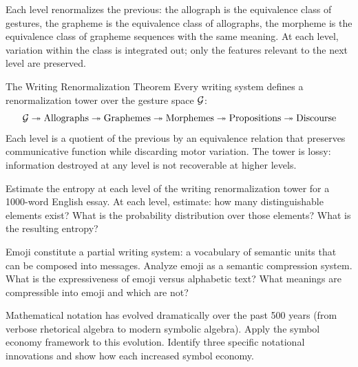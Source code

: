 Each level renormalizes the previous: the allograph is the equivalence
class of gestures, the grapheme is the equivalence class of allographs,
the morpheme is the equivalence class of grapheme sequences with the
same meaning. At each level, variation within the class is integrated
out; only the features relevant to the next level are preserved.

\begin{namedthm}{The Writing Renormalization Theorem}
  Every writing system defines a renormalization tower over the
  gesture space $\mathcal{G}$:
  \[
    \mathcal{G} \twoheadrightarrow \text{Allographs}
    \twoheadrightarrow \text{Graphemes}
    \twoheadrightarrow \text{Morphemes}
    \twoheadrightarrow \text{Propositions}
    \twoheadrightarrow \text{Discourse}
  \]
  Each level is a quotient of the previous by an equivalence relation
  that preserves communicative function while discarding motor variation.
  The tower is lossy: information destroyed at any level is not
  recoverable at higher levels.
\end{namedthm}

\begin{exercise}
  Estimate the entropy at each level of the writing renormalization
  tower for a 1000-word English essay. At each level, estimate: how
  many distinguishable elements exist? What is the probability
  distribution over those elements? What is the resulting entropy?
\end{exercise}

\begin{exercise}
  Emoji constitute a partial writing system: a vocabulary of semantic
  units that can be composed into messages. Analyze emoji as a
  semantic compression system. What is the expressiveness of emoji
  versus alphabetic text? What meanings are compressible into emoji
  and which are not?
\end{exercise}

\begin{exercise}[title={Historical}]
  Mathematical notation has evolved dramatically over the past 500 years
  (from verbose rhetorical algebra to modern symbolic algebra). Apply
  the symbol economy framework to this evolution. Identify three specific
  notational innovations and show how each increased symbol economy.
\end{exercise}
